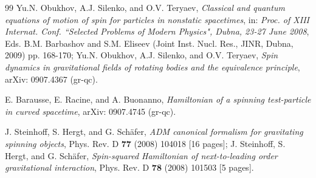 \documentclass[preprint,showpacs,preprintnumbers,amsmath,amssymb]{revtex4}
\begin{document}
\begin{thebibliography}{99}
Yu.N. Obukhov, A.J. Silenko, and O.V. Teryaev,
{\it Classical and quantum equations of motion of spin
for particles in nonstatic spacetimes},
in: {\sl Proc. of XIII Internat. Conf. ``Selected
Problems of Modern Physics", Dubna, 23-27 June 2008},
Eds. B.M. Barbashov and S.M. Eliseev (Joint Inst. Nucl.
Res., JINR, Dubna, 2009) pp. 168-170;
Yu.N. Obukhov, A.J. Silenko, and O.V. Teryaev,
{\it Spin dynamics in gravitational fields of rotating
bodies and the equivalence principle},
arXiv: 0907.4367 (gr-qc).

E. Barausse, E. Racine, and A. Buonanno,
{\it Hamiltonian of a spinning test-particle in curved spacetime},
arXiv: 0907.4745 (gr-qc).

J. Steinhoff, S. Hergt, and G. Sch\"afer,
{\it ADM canonical formalism for gravitating spinning objects},
Phys. Rev. D {\bf 77} (2008) 104018 [16 pages];
J. Steinhoff, S. Hergt, and G. Sch\"afer,
{\it Spin-squared Hamiltonian of next-to-leading order
gravitational interaction},
Phys. Rev. D {\bf 78} (2008) 101503 [5 pages].

\end{thebibliography}
\end{document}

